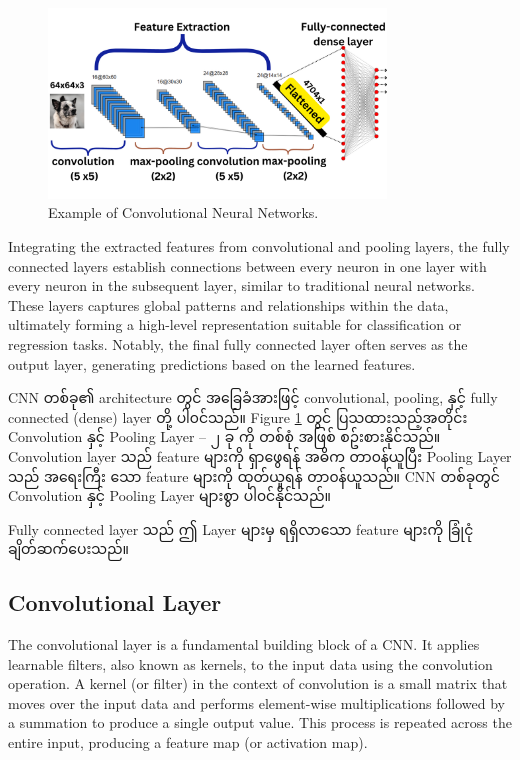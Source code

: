 \vspace{0.5em}
\begin{figure}[h]%
\centering
\includegraphics[width=0.8\textwidth]{imgs/cnn_own.png}
\caption{Example of Convolutional Neural Networks.}\label{fig:CNN}
\end{figure}

Integrating the extracted features from convolutional and pooling layers, the fully connected layers establish connections between every neuron in one layer with every neuron in the subsequent layer, similar to traditional neural networks. These layers captures global patterns and relationships within the data, ultimately forming a high-level representation suitable for classification or regression tasks. Notably, the final fully connected layer often serves as the output layer, generating predictions based on the learned features.

CNN  တစ်ခု၏  architecture တွင် အခြေခံအားဖြင့် convolutional, pooling, နှင့် fully connected (dense) layer တို့ ပါ၀င်သည်။ Figure \ref{fig:CNN} တွင် ပြသထားသည့်အတိုင်း Convolution နှင့် Pooling Layer -- ၂ ခု ကို တစ်စုံ အဖြစ် စဥ်းစားနိုင်သည်။ Convolution layer သည် feature များကို ရှာဖွေရန် အဓိက တာ၀န်ယူပြီး Pooling Layer သည် အရေးကြီး သော feature များကို ထုတ်ယူရန် တာ၀န်ယူသည်။ CNN  တစ်ခုတွင် Convolution နှင့် Pooling Layer များစွာ ပါ၀င်နိုင်သည်။  

Fully connected layer သည် ဤ Layer များမှ ရရှိလာသော feature များကို ခြုံငုံချိတ်ဆက်ပေးသည်။           

\subsection{Convolutional Layer}\label{convLayer}

The convolutional layer is a fundamental building block of a CNN. It applies learnable filters, also known as kernels, to the input data using the convolution operation. A kernel (or filter) in the context of convolution is a small matrix that moves over the input data and performs element-wise multiplications followed by a summation to produce a single output value. This process is repeated across the entire input, producing a feature map (or activation map).

